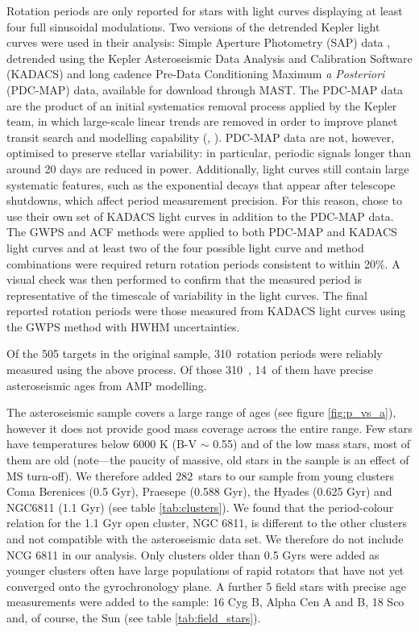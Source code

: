 \documentclass[10pt,preprint]{aastex}
\newcommand{\nastero}{310~}
\newcommand{\nprecise}{14~}
\newcommand{\ncluster}{282~}
\begin{document}
Rotation periods are only reported for stars with light curves displaying at least four full sinusoidal modulations.
Two versions of the detrended Kepler light curves were used in their analysis: Simple Aperture Photometry (SAP) data \citep{Thompson2013}, detrended using the Kepler Asteroseismic Data Analysis and Calibration Software (KADACS) \citep{Garcia2011} and long cadence Pre-Data Conditioning Maximum \emph{a Posteriori} (PDC-MAP) data, available for download through MAST.
The PDC-MAP data are the product of an initial systematics removal process applied by the Kepler team, in which large-scale linear trends are removed in order to improve planet transit search and modelling capability (\citet{Smith_2012}, \citet{Stumpe_2012}).
PDC-MAP data are not, however, optimised to preserve stellar variability: in particular, periodic signals longer than around 20 days are reduced in power.
Additionally, light curves still contain large systematic features, such as the exponential decays that appear after telescope shutdowns, which affect period measurement precision.
For this reason, \citet{Garcia2014} chose to use their own set of KADACS light curves in addition to the PDC-MAP data.
The GWPS and ACF methods were applied to both PDC-MAP and KADACS light curves and at least two of the four possible light curve and method combinations were required return rotation periods consistent to within 20\%.
A visual check was then performed to confirm that the measured period is representative of the timescale of variability in the light curves.
The final reported rotation periods were those measured from KADACS light curves using the GWPS method with HWHM uncertainties.

Of the 505 targets in the original sample, \nastero rotation periods were reliably measured using the above process.
Of those \nastero, \nprecise of them have precise asteroseismic ages from AMP modelling.

The asteroseismic sample covers a large range of ages (see figure \ref{fig:p_vs_a}), however it does not provide good mass coverage across the entire range.
Few stars have temperatures below 6000 K (B-V $\sim$ 0.55) and of the low mass stars, most of them are old (note---the paucity of massive, old stars in the sample is an effect of MS turn-off).
We therefore added \ncluster stars to our sample from young clusters Coma Berenices (0.5 Gyr), Praesepe (0.588 Gyr), the Hyades (0.625 Gyr) and NGC6811 (1.1 Gyr) (see table \ref{tab:clusters}).
We found that the period-colour relation for the 1.1 Gyr open cluster, NGC 6811, is different to the other clusters and not compatible with the asteroseismic data set.
We therefore do not include NCG 6811 in our analysis.
Only clusters older than 0.5 Gyrs were added as younger clusters often have large populations of rapid rotators that have not yet converged onto the gyrochronology plane.
A further 5 field stars with precise age measurements were added to the sample: 16 Cyg B, Alpha Cen A and B, 18 Sco and, of course, the Sun (see table \ref{tab:field_stars}).
\end{document}
